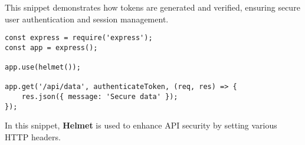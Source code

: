 This snippet demonstrates how tokens are generated and verified, ensuring secure user authentication and session management.

\begin{verbatim}
const express = require('express');
const app = express();

app.use(helmet());

app.get('/api/data', authenticateToken, (req, res) => {
    res.json({ message: 'Secure data' });
});
\end{verbatim}

In this snippet, \textbf{Helmet} is used to enhance API security by setting various HTTP headers.




